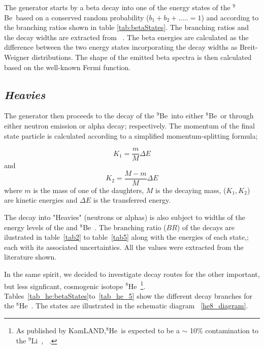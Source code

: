 \documentclass{JINST}
\newcommand{\li}{$^{9}$Li~}
\newcommand{\he}{$^{8}$He~}
\newcommand{\beEIGHT}{$^{8}$Be~}
\newcommand{\beNINE}{$^{9}$Be~}
\begin{document}
The generator starts by a beta decay into one of the energy states of the
\beNINE based on a conserved random probability ($b_{1} + b_{2} + .....= 1$) and
according to the branching ratios shown in table \ref{tab:betaStates}. The
branching ratios and the decay widths are extracted from ~\cite{Tilley2004155}. The beta
energies are calculated as the difference between the two energy states
incorporating the decay widths as Breit-Weigner distributions. The shape of the
emitted beta spectra is then calculated based on the well-known Fermi function.

\subsection*{\it Heavies}

The generator then proceeds to the decay of the \beNINE into either \beEIGHT or
\heFIVE through either neutron emission or alpha decay; respectively. The
momentum of
the final state particle is calculated according to 
a simplified momentum-splitting formula;

  \begin{equation}
K_1 =  \frac{m}{M} \Delta E
\end{equation}
and 
\begin{equation}
K_2 =  \frac{M-m}{M} \Delta E
\end{equation}
where $m$ is the mass of one of the daughters, $M$ is the decaying mass, ($K_1 , K_2$) are kinetic energies and
$\Delta E$ is the transferred energy. 

The decay into "Heavies" (neutrons or alphas) is also subject to widths of the
energy levels of the \heFIVE and \beEIGHT. The branching ratio ($BR$) of the
decays are ilustrated in table~\ref{tab2} to table~\ref{tab5} along with the energies of each
state,; each with its associated uncertainties. All the values were extracted
from the literature shown.

In the same spirit, we decided to investigate decay routes for the other important,
but less signficant, cosmogenic isotope \he \footnote{As published by KamLAND,\he is expected to be a $\sim$ 10\% contamination
to the \li, ~\cite{PhysRevC.81.025807}.}. Tables~\ref{tab_he:betaStates}to~\ref{tab_he_5} show the different decay
branches for the \he. The states are illustrated in the schematic diagram ~\ref{he8_diagram}.
\end{document}
